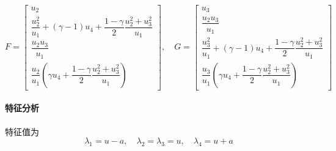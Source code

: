\documentclass{book}
\begin{document}
\begin{equation}
    F = \begin{bmatrix}
        u_2                                                                          \\
        \dfrac{u_2^2}{u_1}+(\gamma-1)u_4+\dfrac{1-\gamma}{2}\dfrac{u_2^2+u_3^2}{u_1} \\
        \dfrac{u_2u_3}{u_1}                                                          \\
        \dfrac{u_2}{u_1}\left(\gamma u_4+\dfrac{1-\gamma}{2}\dfrac{u_2^2+u_3^2}{u_1}\right)
    \end{bmatrix}
    ,\quad G=\begin{bmatrix}
        u_3                                                                          \\
        \dfrac{u_2u_3}{u_1}                                                          \\
        \dfrac{u_3^2}{u_1}+(\gamma-1)u_4+\dfrac{1-\gamma}{2}\dfrac{u_2^2+u_3^2}{u_1} \\
        \dfrac{u_3}{u_1}\left(\gamma u_4+\dfrac{1-\gamma}{2}\dfrac{u_2^2+u_3^2}{u_1}\right)
    \end{bmatrix}
\end{equation}

\paragraph{特征分析}
特征值为
\begin{equation}
    \lambda_{1}=u-a, \quad \lambda_{2}=\lambda_{3}=u, \quad \lambda_{4}=u+a
\end{equation}
\end{document}
